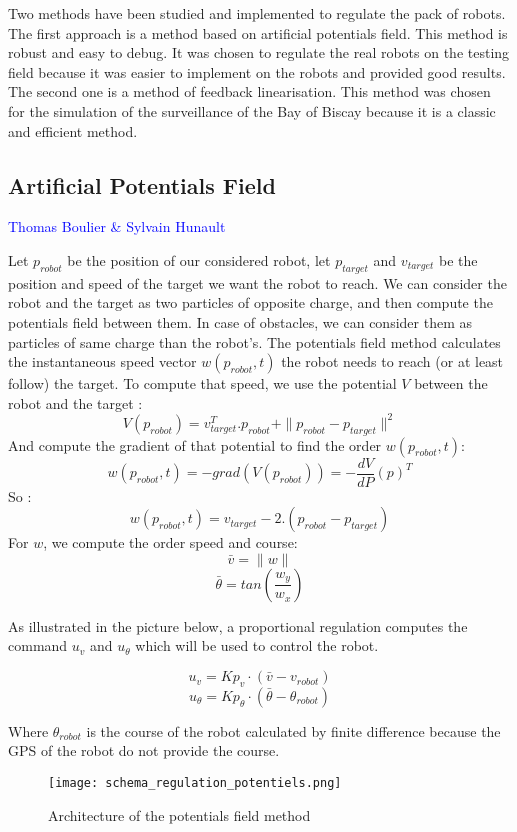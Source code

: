 Two methods have been studied and implemented to regulate the pack of robots. The first approach is a method based on artificial potentials field. This method is robust and easy to debug. It was chosen to regulate the real robots on the testing field because it was easier to implement on the robots and provided good results. The second one is a method of feedback linearisation. This method was chosen for the simulation of the surveillance of the Bay of Biscay because it is a classic and efficient method.

\subsection{Artificial Potentials Field}
\vspace*{0.5 cm}
\textcolor{blue} {Thomas Boulier \& Sylvain Hunault}
\vspace*{0.5cm}

Let $p_{robot}$ be the position of our considered robot, let $p_{target}$ and $v_{target}$ be the position and speed of the target we want the robot to reach.
We can consider the robot and the target as two particles of opposite charge, and then compute the potentials field between them. In case of obstacles, we can consider them as particles of same charge than the robot's.
The potentials field method calculates the instantaneous speed vector $w(p_{robot},t)$ the robot needs to reach (or at least follow) the target. To compute that speed, we use the potential $V$ between the robot and the target :\\
\[ V(p_{robot}) = v^T_{target}. p_{robot} + \|p_{robot}-p_{target}\|^2 \]
And compute the gradient of that potential to find the order $w(p_{robot},t)$:
\[w(p_{robot},t) = -grad(V(p_{robot})) = -\frac{dV}{dP}(p)^T\]
So :
\[w(p_{robot},t) = v_{target}-2.(p_{robot}-p_{target})\]
For $w$, we compute the order speed and course:
\[\bar{v} = \|w\| \]
\[\bar{\theta} = tan(\frac{w_y}{w_x})\]

As illustrated in the picture below, a proportional regulation computes the command $u_v$ and $u_{\theta}$ which will be used to control the robot.

\[ u_v = Kp_v \cdot (\bar{v}-v_{robot}) \]
\[ u_{\theta} = Kp_{\theta} \cdot (\bar{\theta}-\theta_{robot}) \]

Where $\theta_{robot}$ is the course of the robot calculated by finite difference because the GPS of the robot do not provide the course.

\begin{figure}[H]
   \caption{\label{schema_regulation_potentiels} Architecture of the potentials field method}
   \texttt{[image: schema\_regulation\_potentiels.png]}
\end{figure}

